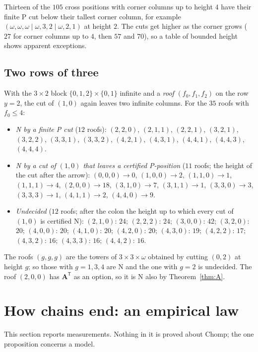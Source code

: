 \documentclass[11pt]{amsart}
\theoremstyle{definition}
\theoremstyle{remark}
\newcommand{\w}{\omega}
\newcommand{\PA}{\mathbf{A}}
\begin{document}
\medskip
Thirteen of the $105$ cross positions with corner columns up to height $4$ have their finite P
cut below their tallest corner column, for example $(\w,\w,\w\mid\w,3,2\mid\w,2,1)$ at height
$2$. The cuts get higher as the corner grows ($27$ for corner columns up to $4$, then $57$ and
$70$), so a table of bounded height shows apparent exceptions.

\subsection{Two rows of three}
With the $3\times2$ block $\{0,1,2\}\times\{0,1\}$ infinite and a \emph{roof}
$(f_0,f_1,f_2)$ on the row $y=2$, the cut of $(1,0)$ again leaves two infinite columns. For the
$35$ roofs with $f_0\le4$:
\begin{itemize}
\item \emph{N by a finite P cut} ($12$ roofs): $(2,2,0)$, $(2,1,1)$, $(2,2,1)$, $(3,2,1)$,
$(3,2,2)$, $(3,3,1)$, $(3,3,2)$, $(4,2,1)$, $(4,3,1)$, $(4,4,1)$, $(4,4,3)$, $(4,4,4)$.
\item \emph{N by a cut of $(1,0)$ that leaves a certified P-position} ($11$ roofs; the height
of the cut after the arrow): $(0,0,0)\to0$, $(1,0,0)\to2$, $(1,1,0)\to1$, $(1,1,1)\to4$,
$(2,0,0)\to18$, $(3,1,0)\to7$, $(3,1,1)\to1$, $(3,3,0)\to3$, $(3,3,3)\to1$, $(4,1,1)\to2$,
$(4,4,0)\to9$.
\item \emph{Undecided} ($12$ roofs; after the colon the height up to which every cut of
$(1,0)$ is certified N): $(2,1,0)$: $24$; $(2,2,2)$: $24$; $(3,0,0)$: $42$; $(3,2,0)$: $20$;
$(4,0,0)$: $20$; $(4,1,0)$: $20$; $(4,2,0)$: $20$; $(4,3,0)$: $19$; $(4,2,2)$: $17$;
$(4,3,2)$: $16$; $(4,3,3)$: $16$; $(4,4,2)$: $16$.
\end{itemize}
The roofs $(g,g,g)$ are the towers of $3\times3\times\omega$ obtained by cutting $(0,2)$ at
height $g$; so those with $g=1,3,4$ are N and the one with $g=2$ is undecided. The roof
$(2,0,0)$ has $\PA^{\mathsf T}$ as an option, so it is N also by Theorem~\ref{thm:A}.

\section{How chains end: an empirical law}\label{sec:law}

This section reports measurements. Nothing in it is proved about Chomp; the one
proposition concerns a model.
\end{document}
